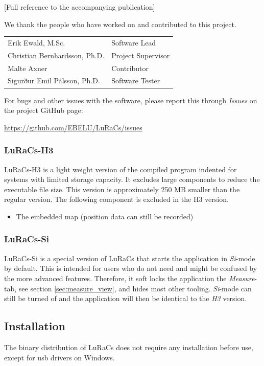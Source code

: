 [Full reference to the accompanying publication]

We thank the people who have worked on and contributed to this project.

\begin{tabular}{ll}
    Erik Ewald, M.Sc. & Software Lead \\
    Christian Bernhardsson, Ph.D. & Project Supervisor \\
    Malte Axner & Contributor \\
    Sigurður Emil Pálsson, Ph.D. & Software Tester \\
\end{tabular}

For bugs and other issues with the software, please report this through \textit{Issues} on the project GitHub page:

\url{https://github.com/EBELU/LuRaCs/issues}

\subsubsection{LuRaCs-H3}
LuRaCs-H3 is a light weight version of the compiled program indented for systems with limited storage capacity. It excludes large components to reduce the executable file size. This version is approximately 250 MB smaller than the regular version. The following component is excluded in the H3 version.
\begin{itemize}
    \item The embedded map (position data can still be recorded)
\end{itemize}

\subsubsection{LuRaCs-Si}
LuRaCs-Si is a special version of LuRaCs that starts the application in \textit{Si}-mode by default. This is intended for users who do not need and might be confused by the more advanced features. Therefore, it soft locks the application the \textit{Measure}-tab, see section \ref{sec:measure_view}, and hides most other tooling. \textit{Si}-mode can still be turned of and the application will then be identical to the \textit{H3} version.

\subsection{Installation}
The binary distribution of LuRaCs does not require any installation before use, except for usb drivers on Windows.

